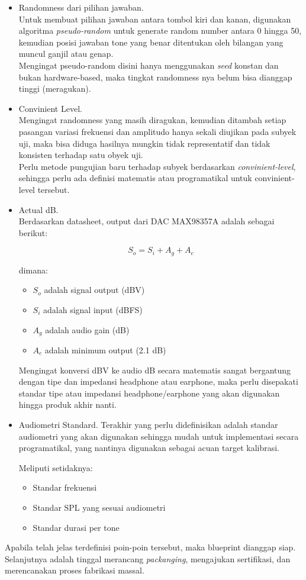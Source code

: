 \documentclass[12pt,]{article}
\begin{document}
	\begin{itemize}
		\item Randomness dari pilihan jawaban.\\
		Untuk membuat pilihan jawaban antara tombol kiri dan kanan, digunakan algoritma \textit{pseudo-random}
		untuk generate random number antara 0 hingga 50, kemudian posisi jawaban tone yang benar ditentukan oleh
		bilangan yang muncul ganjil atau genap.\\
		Mengingat pseudo-random disini hanya menggunakan \textit{seed} konstan dan bukan hardware-based,
		maka tingkat randomness nya belum bisa dianggap tinggi (meragukan).
		
		\item Convinient Level.\\
		Mengingat randomness yang masih diragukan, kemudian ditambah setiap pasangan
		variasi frekuensi dan amplitudo hanya sekali diujikan pada subyek uji, 
		maka bisa diduga hasilnya mungkin tidak representatif dan tidak konsisten terhadap satu obyek uji.\\
		Perlu metode pungujian baru terhadap subyek berdasarkan \textit{convinient-level},
		sehingga perlu ada definisi matematis atau programatikal untuk convinient-level tersebut. 
		
		\item Actual dB.\\
		Berdasarkan datasheet, output dari DAC MAX98357A adalah sebagai berikut:
		
		\[S_o = S_i + A_g + A_c\]
		
		dimana:
		\begin{itemize}
			\item $S_o$ adalah signal output (dBV)
			\item $S_i$ adalah signal input (dBFS)
			\item $A_g$ adalah audio gain (dB)
			\item $A_c$ adalah minimum output (2.1 dB)
		\end{itemize}
		
		Mengingat konversi dBV ke audio dB secara matematis sangat bergantung dengan tipe dan impedansi headphone atau earphone,
		maka perlu disepakati standar tipe atau impedansi headphone/earphone yang akan digunakan hingga produk akhir nanti. 
		
		\item Audiometri Standard.
		Terakhir yang perlu didefinisikan adalah standar audiometri yang akan digunakan sehingga mudah untuk implementasi secara programatikal,
		yang nantinya digunakan sebagai acuan target kalibrasi.
		
		Meliputi setidaknya:
		\begin{itemize}
			\item Standar frekuensi 			
			\item Standar SPL yang sesuai audiometri
			\item Standar durasi per tone
		\end{itemize}
	\end{itemize}

	Apabila telah jelas terdefinisi poin-poin tersebut, maka blueprint dianggap siap.
	Selanjutnya adalah tinggal merancang \textit{packanging}, mengajukan sertifikasi, dan merencanakan proses fabrikasi massal.
		
\end{document}
